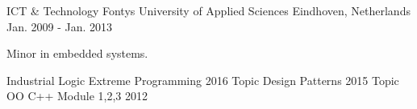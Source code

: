 
\begin{cventries}
  \cventry
    {ICT \& Technology}
    {Fontys University of Applied Sciences}
    {Eindhoven, Netherlands}
    {Jan. 2009 - Jan. 2013}
    {
      \begin{cvitems}
        \item {Minor in embedded systems.}
      \end{cvitems}
    }
\end{cventries}
\begin{cventries}
  \cventry
    {Industrial Logic}
    {Extreme Programming}
    {}
    {2016}
    {}
      \cventry
    {Topic}
    {Design Patterns}
    {}
    {2015}
    {}
      \cventry
    {Topic}
    {OO C++ Module 1,2,3}
    {}
    {2012}
    {}
\end{cventries}

